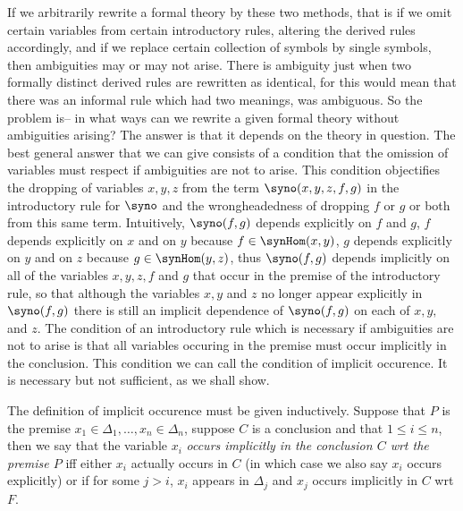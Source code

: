 If we arbitrarily rewrite a formal theory by these two methods, that is if we omit certain variables from certain introductory rules, altering the derived rules accordingly, and if we replace certain collection of symbols by single symbols, then ambiguities may or may not arise.
%
There is ambiguity just when two formally distinct derived rules are rewritten as identical, for this would mean that there was an informal rule which had two meanings, was ambiguous.
%
So the problem is-- in what ways can we rewrite a given formal theory without ambiguities arising?
%
The answer is that it depends on the theory in question.
%
The best general answer that we can give consists of a condition that the omission of variables must respect if ambiguities are not to arise. This condition objectifies the dropping of variables $x,y,z$ from the term $\syno(x,y,z,f,g)$ in the introductory rule for $\syno$ and the wrongheadedness of dropping $f$ or $g$ or both from this same term.
%
Intuitively, $\syno(f,g)$ depends explicitly on $f$ and $g$, $f$ depends explicitly on $x$ and on $y$ because $f\in\synHom(x,y)$, $g$ depends explicitly on $y$ and on $z$ because $g\in\synHom(y,z)$, thus $\syno(f,g)$ depends implicitly on all of the variables $x,y,z,f$ and $g$ that occur in the premise of the introductory rule, so that although the variables $x,y$ and $z$ no longer appear explicitly in $\syno(f,g)$ there is still an implicit dependence of $\syno(f,g)$ on each of $x,y,$ and $z$.
%
The condition of an introductory rule which is necessary if ambiguities are not to arise is that all variables occuring in the premise must occur implicitly in the conclusion.
%
This condition we can call the condition of implicit occurence.
%
It is necessary but not sufficient, as we shall show.

The definition of implicit occurence must be given inductively.
%
Suppose that $P$ is the premise $x_1\in\Delta_1,\ldots,x_n\in\Delta_n$, suppose $C$ is a conclusion and that $1\leq i\leq n$, then we say that the variable $x_i$ \emph{occurs implicitly in the conclusion $C$ wrt the premise $P$} iff either $x_i$ actually occurs in $C$ (in which case we also say $x_i$ occurs explicitly) or if for some $j>i$, $x_i$ appears in $\Delta_j$ and $x_j$ occurs implicitly in $C$ wrt $F$.


